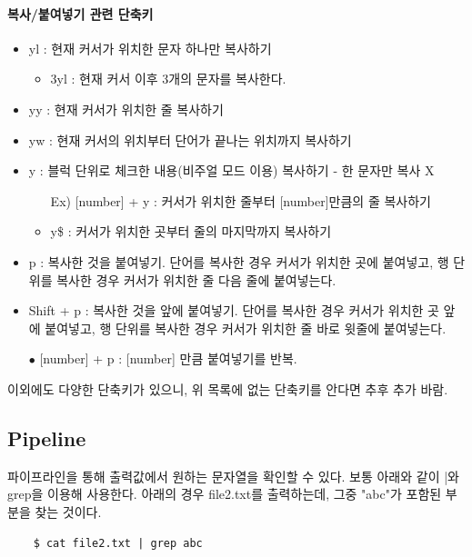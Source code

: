 \paragraph{복사/붙여넣기 관련 단축키}
\begin{itemize}[$\bullet$]
    \item yl : 현재 커서가 위치한 문자 하나만 복사하기
        \begin{itemize}[Ex)]
            \item 3yl : 현재 커서 이후 3개의 문자를 복사한다.
        \end{itemize}
    \item yy : 현재 커서가 위치한 줄 복사하기
    \item yw : 현재 커서의 위치부터 단어가 끝나는 위치까지 복사하기
    \item y : 블럭 단위로 체크한 내용(비주얼 모드 이용) 복사하기 - 한 문자만 복사 X
        \begin{itemize}[Ex)]
            \item[Ex)] [number] + y : 커서가 위치한 줄부터 [number]만큼의 줄 복사하기
            \item y\$ : 커서가 위치한 곳부터 줄의 마지막까지 복사하기
        \end{itemize}
    \item p : 복사한 것을 붙여넣기. 단어를 복사한 경우 커서가 위치한 곳에 붙여넣고, 행 단위를 복사한 경우 커서가 위치한 줄 다음 줄에 붙여넣는다.
    \item Shift + p : 복사한 것을 앞에 붙여넣기. 단어를 복사한 경우 커서가 위치한 곳 앞에 붙여넣고, 행 단위를 복사한 경우 커서가 위치한 줄 바로 윗줄에 붙여넣는다.
    \item[$\bullet$] [number] + p : [number] 만큼 붙여넣기를 반복.
\end{itemize}

이외에도 다양한 단축키가 있으니, 위 목록에 없는 단축키를 안다면 추후 추가 바람.

\subsection{Pipeline}
파이프라인을 통해 출력값에서 원하는 문자열을 확인할 수 있다. 보통 아래와 같이 |와 grep을 이용해 사용한다. 아래의 경우 file2.txt를 출력하는데, 그중 "abc"가 포함된 부분을 찾는 것이다.
    \begin{lstlisting}
    $ cat file2.txt | grep abc
    \end{lstlisting}
